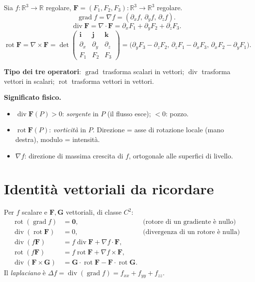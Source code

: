 \documentclass[11pt,a4paper,openany]{book}
\theoremstyle{plain}
\theoremstyle{definition}
\theoremstyle{remark}
\newcommand{\R}{\mathbb{R}}
\newcommand{\Div}{\operatorname{div}}
\newcommand{\Rot}{\operatorname{rot}}
\newcommand{\Grad}{\operatorname{grad}}
\renewcommand{\vec}[1]{\mathbf{#1}}
\newcommand{\F}{\mathbf{F}}
\begin{document}
Sia $f:\R^3\to\R$ regolare, $\F=(F_1,F_2,F_3):\R^3\to\R^3$ regolare.
\begin{equation}
  \Grad f=\nabla f=\left(\partial_x f,\,\partial_y f,\,\partial_z f\right).
  \label{eq:grad}
\end{equation}
\begin{equation}
  \Div\F=\nabla\cdot\F=\partial_x F_1+\partial_y F_2+\partial_z F_3.
  \label{eq:div}
\end{equation}
\begin{equation}
  \Rot\F=\nabla\times\F
  =\det\begin{pmatrix}\vec{i}&\vec{j}&\vec{k}\\\partial_x&\partial_y&\partial_z\\F_1&F_2&F_3\end{pmatrix}
  =\bigl(\partial_y F_3-\partial_z F_2,\,\partial_z F_1-\partial_x F_3,\,\partial_x F_2-\partial_y F_1\bigr).
  \label{eq:rot}
\end{equation}

\textbf{Tipo dei tre operatori}: $\Grad$ trasforma scalari in vettori; $\Div$
trasforma vettori in scalari; $\Rot$ trasforma vettori in vettori.

\begin{nota}
\textbf{Significato fisico.}
\begin{itemize}[leftmargin=*]
  \item $\Div\F(P)>0$: \emph{sorgente} in $P$ (il flusso esce); $<0$: pozzo.
  \item $\Rot\F(P)$: \emph{vorticit\`a} in $P$. Direzione = asse di rotazione
        locale (mano destra), modulo = intensit\`a.
  \item $\nabla f$: direzione di massima crescita di $f$, ortogonale alle
        superfici di livello.
\end{itemize}
\end{nota}

\section{Identit\`a vettoriali da ricordare}

Per $f$ scalare e $\F,\vec{G}$ vettoriali, di classe $C^2$:
\begin{align}
  \Rot(\Grad f)&=\vec{0}, & \text{(rotore di un gradiente \`e nullo)} \label{eq:rotgrad}\\
  \Div(\Rot\F)&=0, & \text{(divergenza di un rotore \`e nulla)} \label{eq:divrot}\\
  \Div(f\F)&=f\Div\F+\nabla f\cdot\F, \\
  \Rot(f\F)&=f\Rot\F+\nabla f\times\F, \\
  \Div(\F\times\vec{G})&=\vec{G}\cdot\Rot\F-\F\cdot\Rot\vec{G}.
\end{align}
Il \emph{laplaciano} \`e $\Delta f=\Div(\Grad f)=f_{xx}+f_{yy}+f_{zz}$.
\end{document}
